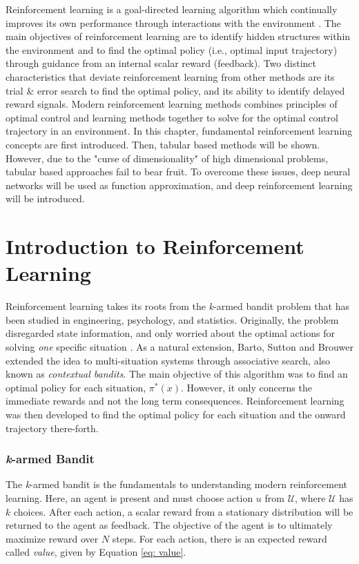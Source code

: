 Reinforcement learning is a goal-directed learning algorithm which continually improves its own performance through interactions with the environment \cite{sutton}. The main objectives of reinforcement learning are to identify hidden structures within the environment and to find the optimal policy (i.e., optimal input trajectory) through guidance from an internal scalar reward (feedback). Two distinct characteristics that deviate reinforcement learning from other methods are its trial \& error search to find the optimal policy, and its ability to identify delayed reward signals. Modern reinforcement learning methods combines principles of optimal control and learning methods together to solve for the optimal control trajectory in an environment.  In this chapter, fundamental reinforcement learning concepts are first introduced.  Then, tabular based methods will be shown.  However, due to the "curse of dimensionality" of high dimensional problems, tabular based approaches fail to bear fruit.  To overcome these issues, deep neural networks will be used as function approximation, and deep reinforcement learning will be introduced.


\section{Introduction to Reinforcement Learning}

Reinforcement learning takes its roots from the \textit{k}-armed bandit problem that has been studied in engineering, psychology, and statistics.  Originally, the problem disregarded state information, and only worried about the optimal actions for solving \textit{one} specific situation \cite{thompson1, thompson2, robbins, bellman_bandit}.  As a natural extension, Barto, Sutton and Brouwer extended the idea to multi-situation systems \cite{bartosuttonbrouwer} through associative search, also known as \textit{contextual bandits}. The main objective of this algorithm was to find an optimal policy for each situation, $\pi^*(x)$.  However, it only concerns the immediate rewards and not the long term consequences. Reinforcement learning was then developed to find the optimal policy for each situation and the onward trajectory there-forth.  

\subsubsection{\textit{k}-armed Bandit}

The \textit{k}-armed bandit is the fundamentals to understanding modern reinforcement learning.  Here, an agent is present and must choose action $u$ from $\mathcal{U}$, where $\mathcal{U}$ has $k$ choices.  After each action, a scalar reward from a stationary distribution will be returned to the agent as feedback.  The objective of the agent is to ultimately maximize reward over $N$ steps.  For each action, there is an expected reward called \textit{value}, given by Equation \ref{eq: value}.

